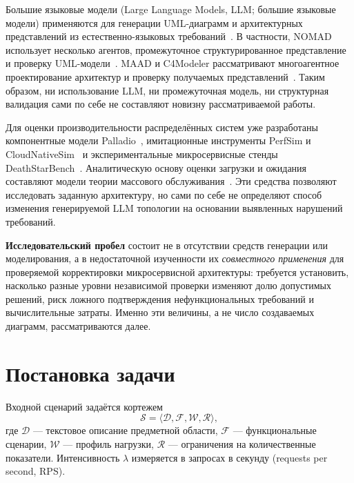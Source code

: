 Большие языковые модели (Large Language Models, LLM; большие языковые модели) применяются для генерации UML-диаграмм и архитектурных представлений из естественно-языковых требований~\cite{hou2024large,ferrari2024modelgeneration}. В частности, NOMAD использует несколько агентов, промежуточное структурированное представление и проверку UML-модели~\cite{nomad2026}. MAAD и C4Modeler рассматривают многоагентное проектирование архитектур и проверку получаемых представлений~\cite{maad2025,c4agents2025}. Таким образом, ни использование LLM, ни промежуточная модель, ни структурная валидация сами по себе не составляют новизну рассматриваемой работы.

Для оценки производительности распределённых систем уже разработаны компонентные модели Palladio~\cite{becker2009palladio}, имитационные инструменты PerfSim и CloudNativeSim~\cite{al2023perfsim,cloudnativesim2024} и экспериментальные микросервисные стенды DeathStarBench~\cite{gan2019deathstarbench}. Аналитическую основу оценки загрузки и ожидания составляют модели теории массового обслуживания~\cite{kleinrock1975queueing,harchol2013performance}. Эти средства позволяют исследовать заданную архитектуру, но сами по себе не определяют способ изменения генерируемой LLM топологии на основании выявленных нарушений требований.

\textbf{Исследовательский пробел} состоит не в отсутствии средств генерации или моделирования, а в недостаточной изученности их \emph{совместного применения} для проверяемой корректировки микросервисной архитектуры: требуется установить, насколько разные уровни независимой проверки изменяют долю допустимых решений, риск ложного подтверждения нефункциональных требований и вычислительные затраты. Именно эти величины, а не число создаваемых диаграмм, рассматриваются далее.

\section{Постановка задачи}

Входной сценарий задаётся кортежем
\begin{equation}
\mathcal{S}=\langle\mathcal{D},\mathcal{F},\mathcal{W},\mathcal{R}\rangle,
\end{equation}
где $\mathcal{D}$ --- текстовое описание предметной области, $\mathcal{F}$ --- функциональные сценарии, $\mathcal{W}$ --- профиль нагрузки, $\mathcal{R}$ --- ограничения на количественные показатели. Интенсивность $\lambda$ измеряется в запросах в секунду (requests per second, RPS).

